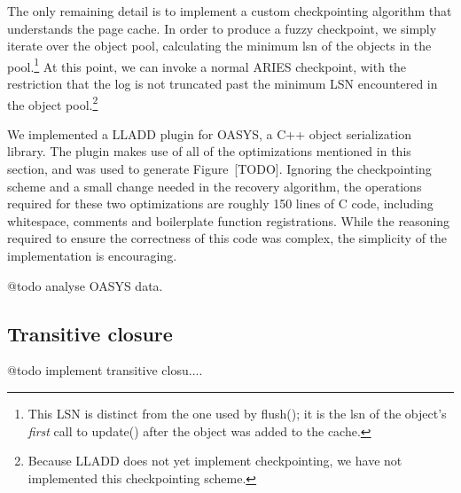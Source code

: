 \documentclass[letterpaper,english]{article}
\begin{document}
The only remaining detail is to implement a custom checkpointing
algorithm that understands the page cache.  In order to produce a
fuzzy checkpoint, we simply iterate over the object pool, calculating
the minimum lsn of the objects in the pool.\footnote{This LSN is distinct from
the one used by flush(); it is the lsn of the object's {\em first}
call to update() after the object was added to the cache.}  At this
point, we can invoke a normal ARIES checkpoint, with the restriction
that the log is not truncated past the minimum LSN encountered in the
object pool.\footnote{Because LLADD does not yet implement
checkpointing, we have not implemented this checkpointing scheme.}

We implemented a LLADD plugin for OASYS, a C++ object serialization
library.  The plugin makes use of all of the optimizations mentioned
in this section, and was used to generate Figure~[TODO].  Ignoring the
checkpointing scheme and a small change needed in the recovery
algorithm, the operations required for these two optimizations are
roughly 150 lines of C code, including whitespace, comments and
boilerplate function registrations.  While the reasoning required to
ensure the correctness of this code was complex, the simplicity of the
implementation is encouraging.

@todo analyse OASYS data.

\subsection{Transitive closure}

@todo implement transitive closu....
\end{document}
